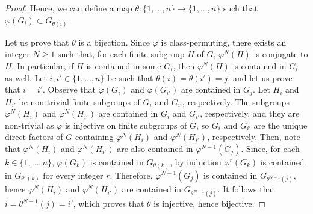 \documentclass[a4paper, 11pt]{amsart}
\theoremstyle{definition}
\theoremstyle{remark}
\renewcommand{\geq}{\geqslant}
\begin{document}
\begin{proof}
\smallskip \noindent Hence, we can define a map $\theta : \lbrace 1,\ldots,n\rbrace\rightarrow \lbrace 1,\ldots,n\rbrace$ such that $\varphi(G_i)\subset G_{\theta(i)}$. 

\smallskip \noindent Let us prove that $\theta$ is a bijection. Since $\varphi$ is class-permuting, there exists an integer $N\geq 1$ such that, for each finite subgroup $H$ of $G$, $\varphi^N(H)$ is conjugate to $H$. In particular, if $H$ is contained in some $G_i$, then $\varphi^N(H)$ is contained in $G_i$ as well. Let $i,i'\in\lbrace 1,\ldots,n\rbrace$ be such that $\theta(i)=\theta(i')=j$, and let us prove that $i=i'$. Observe that $\varphi(G_i)$ and $\varphi(G_{i'})$ are contained in $G_j$. Let $H_i$ and $H_{i'}$ be non-trivial finite subgroups of $G_i$ and $G_{i'}$, respectively. The subgroups $\varphi^N(H_i)$ and $\varphi^N(H_{i'})$ are contained in $G_i$ and $G_{i'}$, respectively, and they are non-trivial as $\varphi$ is injective on finite subgroups of $G$, so $G_i$ and $G_{i'}$ are the unique direct factors of $G$ containing $\varphi^N(H_i)$ and $\varphi^N(H_{i'})$, respectively. Then, note that $\varphi^N(H_i)$ and $\varphi^N(H_{i'})$ are also contained in $\varphi^{N-1}(G_j)$. Since,  for each $k\in\lbrace 1,\ldots,n\rbrace$, $\varphi(G_k)$ is contained in $G_{\theta(k)}$, by induction $\varphi^{r}(G_k)$ is contained in $G_{\theta^r(k)}$ for every integer $r$. Therefore, $\varphi^{N-1}(G_j)$ is contained in $G_{\theta^{N-1}(j)}$, hence $\varphi^N(H_i)$ and $\varphi^N(H_{i'})$ are contained in $G_{\theta^{N-1}(j)}$. It follows that $i=\theta^{N-1}(j)=i'$, which proves that $\theta$ is injective, hence bijective. 




\end{proof}
\end{document}
